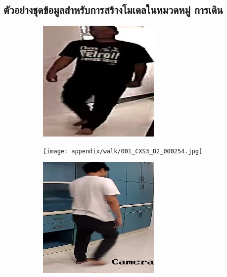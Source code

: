 \clearpage
\subsection*{ตัวอย่างชุดข้อมูลสำหรับการสร้างโมเดลในหมวดหมู่ การเดิน}
\begin{figure}[!ht]
    \centering
    \begin{subfigure}[b]{0.45\linewidth}
      \includegraphics[width=\linewidth]{appendix/walk/000_CXS0_D0_000568.jpg}
    \end{subfigure}
    \begin{subfigure}[b]{0.45\linewidth}
      \texttt{[image: appendix/walk/001\_CXS3\_D2\_000254.jpg]}
    \end{subfigure}
   \begin{subfigure}[b]{0.45\linewidth}
      \includegraphics[width=\linewidth]{appendix/walk/000_CXS0_D0_000187.jpg}

\end{subfigure}
\end{figure}

